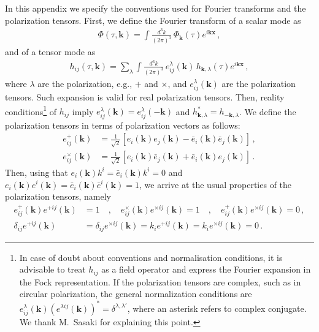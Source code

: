 \documentclass[a4paper,11pt]{article}
\numberwithin{equation}{section}
\begin{document}
In this appendix we specify the conventions used for Fourier transforms and the polarization tensors. First, we define the Fourier transform of a scalar mode as
\begin{align}
\Phi(\tau,\mathbf{k})=\int\frac{d^3 k}{(2\pi)^3}\,\Phi_{\mathbf{k}}(\tau)e^{i\mathbf{k}\mathbf{x}}\,,
\end{align}
and of a tensor mode as
\begin{align}
h_{ij}(\tau,\mathbf{k})=\sum_\lambda\int\frac{d^3 k}{(2\pi)^3}\,e^\lambda_{ij}(\mathbf{k})\,h_{\mathbf{k},\lambda}(\tau)e^{i\mathbf{k}\mathbf{x}}\,,
\end{align}
where $\lambda$ are the polarization, e.g., $+$ and $\times$, and $e^\lambda_{ij}(\mathbf{k})$ are the polarization tensors. Such expansion is valid for real polarization tensors. Then, reality conditions\footnote{In case of doubt about conventions and normalisation conditions, it is advisable to treat $h_{ij}$ as a field operator and express the Fourier expansion in the Fock representation. If the polarization tensors are complex, such as in circular polarization, the general normalization conditions are $e^{\lambda}_{ij}(\mathbf{k})\left(e^{\lambda ij}(\mathbf{k})\right)^*=\delta^{\lambda,\lambda'}$, where an asterisk refers to complex conjugate. We thank M.~Sasaki for explaining this point.} of $h_{ij}$ imply \cite{Caprini:2018mtu} $e^\lambda_{ij}(\mathbf{k})=e^\lambda_{ij}(-\mathbf{k})$ and $h^*_{\mathbf{k},\lambda}=h_{-\mathbf{k},\lambda}$. We define the polarization tensors in terms of polarization vectors as follows:
\begin{align}
e^{+}_{ij}(\mathbf{k})&=\frac{1}{\sqrt{2}}\left[e_{i}(\mathbf{k})e_{j}(\mathbf{k})-\bar e_{i}(\mathbf{k})\bar e_{j}(\mathbf{k})\right]\,,\\
e^{\times}_{ij}(\mathbf{k})&=\frac{1}{\sqrt{2}}\left[e_{i}(\mathbf{k})\bar e_{j}(\mathbf{k})+\bar e_{i}(\mathbf{k}) e_{j}(\mathbf{k})\right]\,.
\end{align}
Then, using that $e_{i}(\mathbf{k})k^i=\bar e_{i}(\mathbf{k})k^i=0$ and $e_{i}(\mathbf{k})e^{i}(\mathbf{k})=\bar e_{i}(\mathbf{k})\bar e^{i}(\mathbf{k})=1$, we arrive at the usual properties of the polarization tensors, namely
\begin{align}
e^{+}_{ij}(\mathbf{k})e^{+ ij}(\mathbf{k})&=1\quad,\quad e^{\times}_{ij}(\mathbf{k})e^{\times ij}(\mathbf{k})=1\quad,\quad e^{+}_{ij}(\mathbf{k})e^{\times ij}(\mathbf{k})=0\,,\nonumber\\
\delta_{ij}e^{+ij}(\mathbf{k})&=\delta_{ij}e^{\times ij}(\mathbf{k})=k_ie^{+ij}(\mathbf{k})=k_ie^{\times ij}(\mathbf{k})=0\,.
\end{align}
\end{document}
